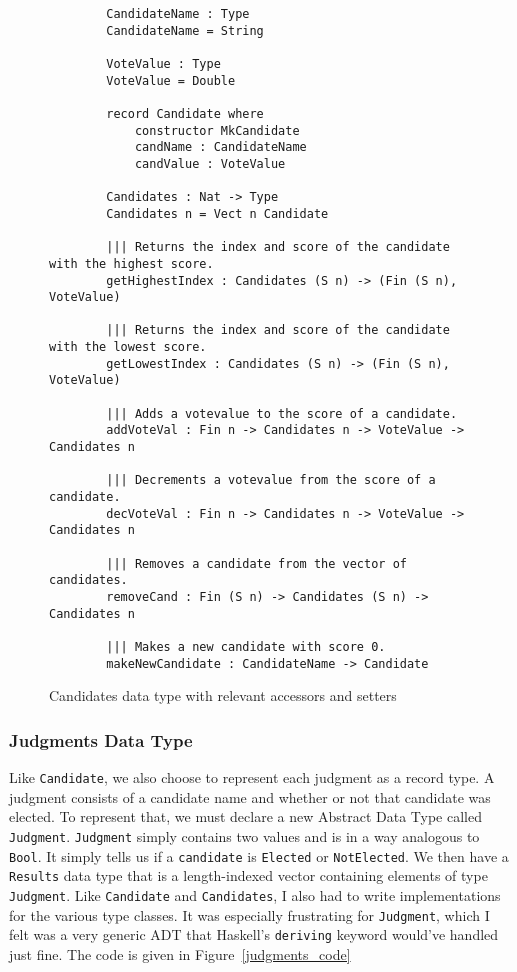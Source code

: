 \begin{figure}[ht!!!!!!!!!!!!!!]
    \caption{Candidates data type with relevant accessors and setters}
    \label{candidates_code}
    \begin{lstlisting}
        CandidateName : Type
        CandidateName = String

        VoteValue : Type
        VoteValue = Double

        record Candidate where
            constructor MkCandidate
            candName : CandidateName
            candValue : VoteValue
        
        Candidates : Nat -> Type
        Candidates n = Vect n Candidate

        ||| Returns the index and score of the candidate with the highest score. 
        getHighestIndex : Candidates (S n) -> (Fin (S n), VoteValue)

        ||| Returns the index and score of the candidate with the lowest score. 
        getLowestIndex : Candidates (S n) -> (Fin (S n), VoteValue)

        ||| Adds a votevalue to the score of a candidate. 
        addVoteVal : Fin n -> Candidates n -> VoteValue -> Candidates n
        
        ||| Decrements a votevalue from the score of a candidate. 
        decVoteVal : Fin n -> Candidates n -> VoteValue -> Candidates n

        ||| Removes a candidate from the vector of candidates. 
        removeCand : Fin (S n) -> Candidates (S n) -> Candidates n

        ||| Makes a new candidate with score 0. 
        makeNewCandidate : CandidateName -> Candidate
    \end{lstlisting}
\end{figure}

\subsubsection{Judgments Data Type}

Like \texttt{Candidate}, we also choose to represent each judgment as a record
type. A judgment consists of a candidate name and whether or not that candidate
was elected. To represent that, we must declare a new Abstract Data Type called
\texttt{Judgment}. \texttt{Judgment} simply contains two values and is in a way
analogous to \texttt{Bool}. It simply tells us if a \texttt{candidate} is
\texttt{Elected} or \texttt{NotElected}. We then have a \texttt{Results} data
type that is a length-indexed vector containing elements of type
\texttt{Judgment}. Like \texttt{Candidate} and \texttt{Candidates}, I also had
to write implementations for the various type classes. It was especially
frustrating for \texttt{Judgment}, which I felt was a very generic ADT that
Haskell's \texttt{deriving} keyword would've handled just fine. The code is
given in Figure~\ref{judgments_code}

